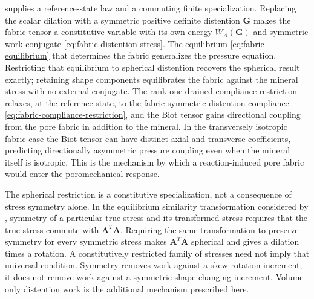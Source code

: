 \documentclass[11pt]{article}
\begin{document}
 supplies a reference-state law and a commuting
finite specialization. Replacing the scalar dilation
with a symmetric positive definite distention \(\mathbf G\) makes the
fabric tensor a constitutive variable with its own energy
\(W_A(\mathbf G)\) and symmetric work conjugate
\eqref{eq:fabric-distention-stress}. The equilibrium
\eqref{eq:fabric-equilibrium} that determines the fabric generalizes the
pressure equation. Restricting that equilibrium to spherical distention
recovers the spherical result exactly; retaining shape components
equilibrates the fabric against the mineral stress with no external
conjugate. The rank-one drained compliance
restriction relaxes, at the reference state, to the fabric-symmetric
distention compliance
\eqref{eq:fabric-compliance-restriction}, and the Biot tensor gains
directional coupling from the pore fabric in addition to the mineral. In
the transversely isotropic fabric case the Biot tensor can have distinct
axial and transverse coefficients, predicting directionally asymmetric pressure
coupling even when the mineral itself is isotropic. This is the mechanism
by which a reaction-induced pore fabric would enter the poromechanical
response.

The spherical restriction is a constitutive specialization, not a
consequence of stress symmetry alone. In the equilibrium similarity
transformation considered by \citet[section~8.9]{drumheller2000},
symmetry of a particular true stress and its transformed stress requires
that the true stress commute with \(\mathbf A^T\mathbf A\).
Requiring the same transformation to preserve symmetry for every
symmetric stress makes \(\mathbf A^T\mathbf A\) spherical and gives
a dilation times a rotation. A constitutively restricted family of
stresses need not imply that universal condition. Symmetry removes work
against a skew rotation increment; it does not remove work against a
symmetric shape-changing increment. Volume-only distention work is the
additional mechanism prescribed here.
\end{document}
